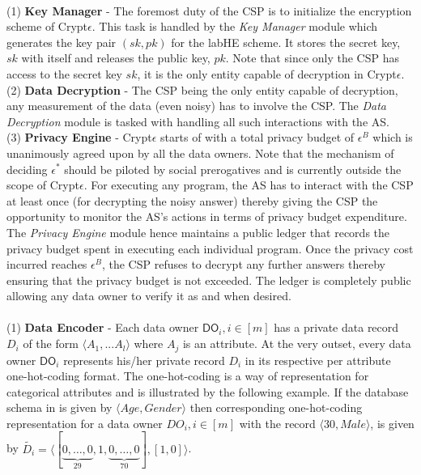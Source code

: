 \\
(1)\textbf{ Key Manager }- The foremost duty of the \textsf{CSP} is to initialize the encryption scheme of Crypt$\epsilon$. This task is handled by the \textit{Key Manager} module which generates the key pair $(sk,pk)$ for the \textsf{labHE} scheme. It stores the secret key, $sk$ with itself and releases the public key, $pk$. Note that since only the \textsf{CSP} has access to the secret key $sk$, it is the only entity capable of decryption in Crypt$\epsilon$.\\
(2)\textbf{ Data Decryption }- The \textsf{CSP} being the only entity capable of decryption,  any measurement of the data (even noisy) has to involve the \textsf{CSP}. The \textit{Data Decryption} module is tasked with handling all such interactions with the \textsf{AS}. \\
(3)\textbf{ Privacy Engine }- Crypt$\epsilon$ starts of with a total privacy budget of $\epsilon^B$ which is unanimously agreed upon by all the data owners. Note that the mechanism of deciding $\epsilon^*$ should be piloted by social prerogatives \cite{e1,e2} 
and is currently outside the scope of Crypt$\epsilon$. For executing any program, the \textsf{AS} has to interact with the \textsf{CSP} at least once (for decrypting the noisy answer) thereby giving the \textsf{CSP} the opportunity to monitor the \textsf{AS}'s actions in terms of privacy budget expenditure. The \textit{Privacy Engine} module hence maintains a public ledger that records the privacy budget spent in executing each individual program. Once the privacy cost incurred reaches 
$\epsilon^B$, the \textsf{CSP} refuses to decrypt any further answers thereby ensuring that the privacy budget is not exceeded.  The ledger is completely public allowing any data owner to verify it as and when desired.\\
\\
(1)\textbf{ Data Encoder} -  Each data owner $\textsf{DO}_i, i \in [m]$ has a private data record $D_i$ of the form $\langle A_1,...A_l\rangle$ where ${A}_j$ is an attribute. At the very outset, every data owner  $\textsf{DO}_i$ represents his/her private record $D_i$ in its respective per attribute one-hot-coding format. The one-hot-coding is a way of representation for categorical attributes and is illustrated by the following example. 
If the database schema in \system is given by  $\langle Age,Gender\rangle$ then corresponding one-hot-coding representation for a data owner $DO_i, i \in [m]$ with the record $\langle 30, Male\rangle$, is given by $\tilde{D_i}=\langle[\underbrace{0,\ldots,0}_{29},1,\underbrace{0,\ldots,0}_{70}],[1,0]\rangle$. \\
